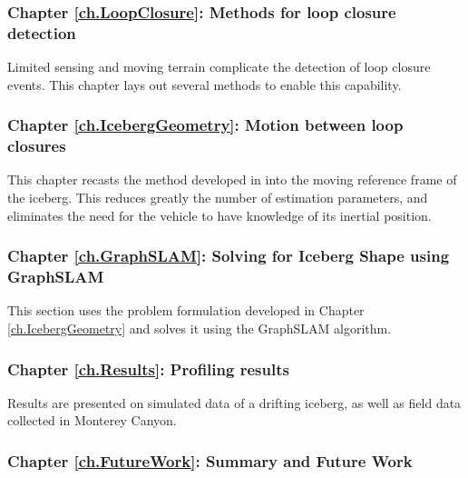 \subsubsection*{Chapter \ref{ch.LoopClosure}: Methods for loop closure detection} Limited sensing and moving terrain complicate the detection of loop closure events. This chapter lays out several methods to enable this capability.

\subsubsection*{Chapter \ref{ch.IcebergGeometry}: Motion between loop closures}  This chapter recasts the method developed in \cite{Kimball2011b} into the moving reference frame of the iceberg. This reduces greatly the number of estimation parameters, and eliminates the need for the vehicle to have knowledge of its inertial position.

\subsubsection*{Chapter \ref{ch.GraphSLAM}: Solving for Iceberg Shape using GraphSLAM} This section uses the problem formulation developed in Chapter \ref{ch.IcebergGeometry} and solves it using the GraphSLAM algorithm.

\subsubsection*{Chapter \ref{ch.Results}: Profiling results} Results are presented on simulated data of a drifting iceberg, as well as field data collected in Monterey Canyon. 

\subsubsection*{Chapter \ref{ch.FutureWork}: Summary and Future Work}

